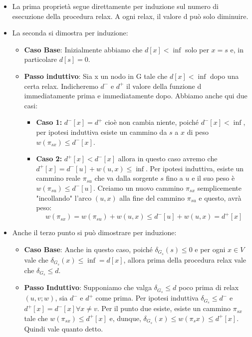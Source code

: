\begin{itemize}
    \item La prima proprietà segue direttamente per induzione sul numero di esecuzione della procedura relax. A ogni relax, il valore d può solo diminuire.
    \item La seconda si dimostra per induzione:
        \begin{itemize}
            \item \textbf{Caso Base}: Inizialmente abbiamo che $d[x] < \inf$ solo per $x=s$ e, in particolare $d[s]=0$.
            \item \textbf{Passo induttivo}: Sia x un nodo in G tale che $d[x] < \inf$ dopo una certa relax. Indicheremo $d^{-}$ e $d^{+}$ il valore della funzione d immediatamente prima e immediatamente dopo. Abbiamo anche qui due casi:
            \begin{itemize}
                \item \textbf{Caso 1:} $d^{-}[x] = d^{+}$ cioè non cambia niente, poiché $d^{-}[x] < \inf$, per ipotesi induttiva esiste un cammino da $s$ a $x$ di peso $w(\pi_{sx}) \leq d^{-}[x]$.
                \item \textbf{Caso 2:} $d^{+}[x]<d^{-}[x]$ allora in questo caso avremo che $d^+[x] = d^-[u] + w(u, x)\leq \inf$. Per ipotesi induttiva, esiste un cammino reale $\pi_{su}$ che va dalla sorgente $s$ fino a $u$ e il suo peso è $w(\pi_{su}) \le d^-[u]$. Creiamo un nuovo cammino $\pi_{sx}$ semplicemente "incollando" l'arco $(u, x)$ alla fine del cammino $\pi_{su}$ e questo, avrà peso:
                \[w(\pi_{sx}) = w(\pi_{su})+ w(u,x) \leq d^-[u] + w(u,x) = d^+[x]\]
            \end{itemize}
        \end{itemize}
    \item Anche il terzo punto si può dimostrare per induzione:
        \begin{itemize}
            \item \textbf{Caso Base}: Anche in questo caso, poiché $\delta_{G_s}(s) \leq 0$ e per ogni $x \in V$ vale che $\delta_{G_s}(x) \leq \inf = d[x]$, allora prima della procedura relax vale che $\delta_{G_s} \leq d$.
            \item \textbf{Passo Induttivo}: Supponiamo che valga $\delta_{G_s} \leq d$ poco prima di relax $(u,v;w)$, sia $d^-$ e $d^+$ come prima. Per ipotesi induttiva $\delta_{G_s} \leq d^-$ e $d^+[x] = d^-[x] \forall x \neq v$. Per il punto due esiste, esiste un cammino $\pi_{sx}$ tale che $w(\pi_{sx}) \leq d^+[x]$ e, dunque, $\delta_{G_s}(x)\leq w(\pi_sx) \leq d^+[x]$. Quindi vale quanto detto. 
        \end{itemize}
\end{itemize}

